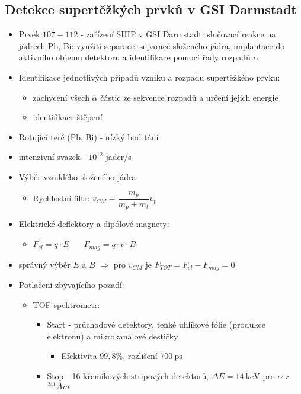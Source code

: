\documentclass[../../main.tex]{subfiles}
\begin{document}
\subsection{Detekce supertěžkých prvků v GSI Darmstadt}

\begin{itemize}
	\item Prvek $107 - 112$ - zařízení SHIP v GSI Darmstadt: slučovací reakce na jádrech Pb, Bi: využití separace, separace složeného jádra, implantace do aktivního objemu detektoru a identifikace pomocí řady rozpadů $\alpha$
	\item  Identifikace jednotlivých případů vzniku a rozpadu supertěžkého prvku:
	\begin{itemize}
		\item zachycení všech $\alpha$ částic ze sekvence rozpadů a určení jejich energie
		\item identifikace štěpení
	\end{itemize} 
    \item Rotující terč (Pb, Bi) - nízký bod tání
    \item intenzivní svazek - $10^{12}$ jader/s
    \item Výběr vzniklého složeného jádra:
    \begin{itemize}
    	\item Rychlostní filtr: $v_{CM} = \dfrac{m_p}{m_p + m_t}v_p$
    \end{itemize}
   \item Elektrické deflektory a dipólové magnety:
   \begin{itemize}
   	\item $F_{el} = q \cdotp E ~~~~~~~~ F_{mag} = q \cdotp v \cdotp B$
   \end{itemize}
    \item správný výběr $E$ a $B$ $\Rightarrow$ pro $v_{CM} $ je $F_{TOT} = F_{el} - F_{mag} = 0$
    \item Potlačení zbývajícího pozadí:
    \begin{itemize}
    	\item TOF spektrometr:
    	\begin{itemize}
    		\item Start - průchodové detektory, tenké uhlíkové fólie (produkce elektronů) a mikrokanálové destičky
    		\begin{itemize}
    			\item Efektivita $99,8 \%$, rozlišení $700 ~\mathrm{ps}$
    		\end{itemize}
    	     \item Stop - 16 křemíkových stripových detektorů, $\Delta E = 14 ~\mathrm{keV}$ pro $\alpha$ z $^{241}Am$

\end{itemize}
\end{itemize}
\end{itemize}
\end{document}
